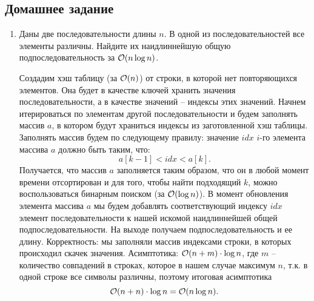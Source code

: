 

\subsection{Домашнее задание}

\begin{enumerate}

  \item {}
    Даны две последовательности длины $n$. В одной из последовательностей все элементы различны. Найдите
    их наидлиннейшую общую подпоследовательность за $\mathcal{O}(n \log n)$. 
	\begin{solution}
    Создадим хэш таблицу (за $\mathcal{O}(n)$) от строки, в которой нет повторяющихся элементов. Она будет в качестве ключей хранить значения последовательности, а в качестве значений -- индексы этих значений. Начнем итерироваться по элементам другой последовательности и будем заполнять массив $a$, в котором будут храниться индексы из заготовленной хэш таблицы. Заполнять массив будем по следующему правилу: значение $idx$ $i$-го элемента массива $a$ должно быть таким, что:
    \begin{equation}
        a[k-1] < idx < a[k].
    \end{equation}
    Получается, что массив $a$ заполняется таким образом, что он в любой момент времени отсортирован и для того, чтобы найти подходящий $k$, можно воспользоваться бинарным поиском (за $\mathcal{O}(\log n)$). В момент обновления элемента массива $a$ мы будем добавлять соответствующий индексу $idx$ элемент последовательности к нашей искомой наидлиннейшей общей подпоследовательности. На выходе получаем подпоследовательность и ее длину. Корректность: мы заполняли массив индексами строки, в которых происходил скачек значения. Асимптотика: $\mathcal{O}(n+m)\cdot \log n$, где $m$ -- количество совпадений в строках, которое в нашем случае максимум $n$, т.к. в одной строке все символы различны, поэтому итоговая асимптотика
    \begin{equation}
      \mathcal{O}(n+n)\cdot \log n = \mathcal{O}(n \log n).
    \end{equation} 
	\end{solution}


\end{enumerate}
